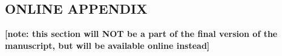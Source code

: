 \documentclass[10pt, letterpaper]{article}
\begin{document}
\begin{spacing}{1.4}
    








 \section*{\Huge ONLINE APPENDIX}
 \textbf{[note: this section will NOT be a part of the final version of
   the manuscript, but will be available online instead]} %






\end{spacing}
\end{document}
